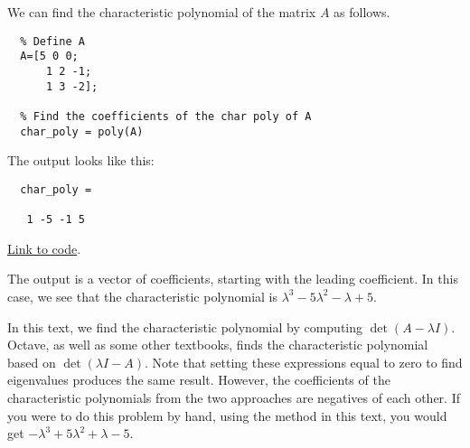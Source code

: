 \documentclass{ximera}
\begin{document}
  \begin{template}\label{temp:charPoly}
      We can find the characteristic polynomial of the matrix $A$ as follows.
  
      \begin{verbatim}
  % Define A
  A=[5 0 0; 
      1 2 -1; 
      1 3 -2];
  
  % Find the coefficients of the char poly of A
  char_poly = poly(A)
      \end{verbatim}
  
  The output looks like this:
  
  \begin{verbatim}
  char_poly =
  
   1 -5 -1 5
  \end{verbatim}
  
  \href{https://sagecell.sagemath.org/?z=eJxTVXBJTcvMS1Vw5OVytI02VTBQMLBW4OVSAAJDBSMFXUMEz1hB1yjWmpeLl0tVwS0zL0WhJCNVITk_NS0tMzkzNa-kWCE_DSKWkVikUJCfUwkSABoM4seD-bZgYQ1HTQCF1h-X&lang=octave&interacts=eJyLjgUAARUAuQ==}{Link to code}.
  
  The output is a vector of coefficients, starting with the leading coefficient.  In this case, we see that the characteristic polynomial is $\lambda^3-5\lambda^2-\lambda+5$.
  
  \begin{warning}
      In this text, we find the characteristic polynomial by computing $\det{\left(A-\lambda I\right)}$.  Octave, as well as some other textbooks, finds the characteristic polynomial based on $\det{\left(\lambda I-A\right)}$.  Note that setting these expressions equal to zero to find eigenvalues produces the same result. However, the coefficients of the characteristic polynomials from the two approaches are negatives of each other.  If you were to do this problem by hand, using the method in this text, you would get $-\lambda^3+5\lambda^2+\lambda-5$.
  \end{warning}
  \end{template}
  
\end{document}
